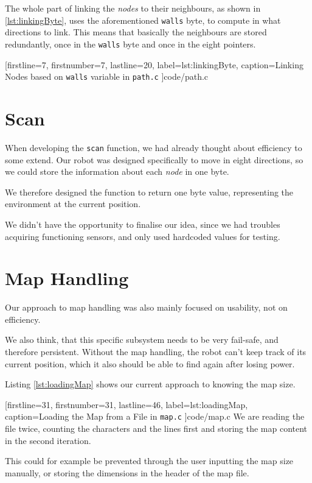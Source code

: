 The whole part of linking the \emph{nodes} to their neighbours,
as shown in \ref{lst:linkingByte},
uses the aforementioned {\tt walls} byte,
to compute in what directions to link.
This means that basically the neighbours are stored redundantly,
once in the {\tt walls} byte and once in the eight pointers.


[firstline=7,				%
firstnumber=7,
lastline=20,
label=lst:linkingByte,	%
caption={Linking Nodes based on {\tt walls} variable in {\tt path.c}}
]{code/path.c}
%

\section{Scan}
When developing the {\tt scan} function,
we had already thought about efficiency to some extend.
Our robot was designed specifically to move in eight directions,
so we could store the information about each \emph{node} in one byte.

We therefore designed the function to return one byte value,
representing the environment at the current position.

We didn't have the opportunity to finalise our idea,
since we had troubles acquiring functioning sensors,
and only used hardcoded values for testing.

\section{Map Handling}
Our approach to map handling was also mainly focused on usability,
not on efficiency.

We also think, that this specific subsystem needs to be very fail-safe,
and therefore persistent.
Without the map handling,
the robot can't keep track of its current position,
which it also should be able to find again after losing power.

Listing \ref{lst:loadingMap} shows our current approach to knowing the map size.


[firstline=31,				%
firstnumber=31,
lastline=46,
label=lst:loadingMap,	%
caption={Loading the Map from a File in {\tt map.c}}
]{code/map.c}
%
We are reading the file twice,
counting the characters and the lines first and storing the map content in the second iteration.

This could for example be prevented through the user inputting the map size manually,
or storing the dimensions in the header of the map file.

